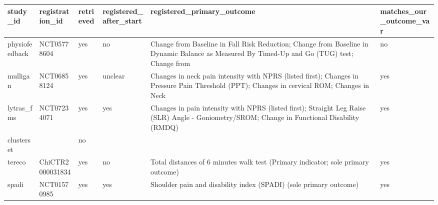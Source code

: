 {
\begin{longtable}[]{@{}
  >{\raggedright\arraybackslash}p{}
  >{\raggedright\arraybackslash}p{}
  >{\raggedright\arraybackslash}p{}
  >{\raggedright\arraybackslash}p{}
  >{\raggedright\arraybackslash}p{}
  >{\raggedright\arraybackslash}p{}@{}}
\toprule\noalign{}
\begin{minipage}[b]{\linewidth}\raggedright
study\_id
\end{minipage} & \begin{minipage}[b]{\linewidth}\raggedright
registration\_id
\end{minipage} & \begin{minipage}[b]{\linewidth}\raggedright
retrieved
\end{minipage} & \begin{minipage}[b]{\linewidth}\raggedright
registered\_after\_start
\end{minipage} & \begin{minipage}[b]{\linewidth}\raggedright
registered\_primary\_outcome
\end{minipage} & \begin{minipage}[b]{\linewidth}\raggedright
matches\_our\_outcome\_var
\end{minipage} \\
\midrule\noalign{}
\endhead
\bottomrule\noalign{}
\endlastfoot
physiofeedback & NCT05778604 & yes & no & Change from Baseline in Fall Risk Reduction; Change from Baseline in Dynamic Balance as Measured By Timed-Up and Go (TUG) test; Change from & no \\
mulligan & NCT06858124 & yes & unclear & Changes in neck pain intensity with NPRS (listed first); Changes in Pressure Pain Threshold (PPT); Changes in cervical ROM; Changes in Neck & yes \\
lytras\_fms & NCT07234071 & yes & yes & Changes in pain intensity with NPRS (listed first); Straight Leg Raise (SLR) Angle - Goniometry/SROM; Change in Functional Disability (RMDQ) & yes \\
clusterset & & no & & & \\
tereco & ChiCTR2000031834 & yes & no & Total distances of 6 minutes walk test (Primary indicator; sole primary outcome) & yes \\
spadi & NCT01570985 & yes & yes & Shoulder pain and disability index (SPADI) (sole primary outcome) & yes \\

\end{longtable}}
